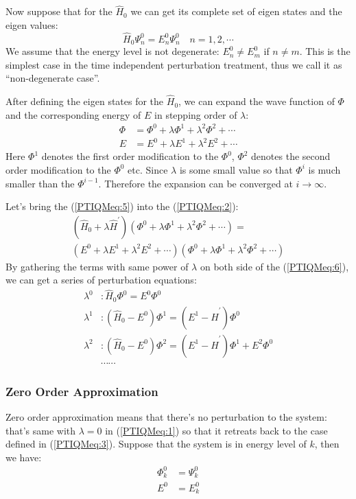 Now suppose that for the $\hat{H}_{0}$ we can get its complete set
of eigen states and the eigen values:
\begin{equation}\label{PTIQMeq:3}
\hat{H}_{0}\Psi^{0}_{n} = E^{0}_{n}\Psi^{0}_{n} \quad n = 1,
2,\cdots
\end{equation}
We assume that the energy level is not degenerate: $E^{0}_{n} \neq
E^{0}_{m}$ if $n \neq m$. This is the simplest case in the time
independent perturbation treatment, thus we call it as
``non-degenerate case''.

After defining the eigen states for the $\hat{H}_{0}$, we can expand
the wave function of $\Phi$ and the corresponding energy of $E$ in
stepping order of $\lambda$:
\begin{align}\label{PTIQMeq:5}
\Phi &= \Phi^{0} + \lambda\Phi^{1} + \lambda^{2}\Phi^{2} + \cdots
\nonumber \\
E &= E^{0} + \lambda E^{1} + \lambda^{2}E^{2} + \cdots
\end{align}
Here $\Phi^{1}$ denotes the first order modification to the
$\Phi^{0}$, $\Phi^{2}$ denotes the second order modification to the
$\Phi^{0}$ etc. Since $\lambda$ is some small value so that
$\Phi^{i}$ is much smaller than the $\Phi^{i-1}$. Therefore the
expansion can be converged at $i \rightarrow \infty$.

Let's bring the (\ref{PTIQMeq:5}) into the (\ref{PTIQMeq:2}):
\begin{multline}\label{PTIQMeq:6}
(\hat{H}_{0} + \lambda\hat{H}^{'})(\Phi^{0} + \lambda\Phi^{1} +
\lambda^{2}\Phi^{2} + \cdots) = \\
(E^{0} + \lambda E^{1} + \lambda^{2}E^{2} + \cdots)(\Phi^{0} +
\lambda\Phi^{1} + \lambda^{2}\Phi^{2} + \cdots)
\end{multline}
By gathering the terms with same power of $\lambda$ on both side of
the (\ref{PTIQMeq:6}), we can get a series of perturbation
equations:
\begin{align}\label{PTIQMeq:7}
\lambda^{0} &: \hat{H}_{0}\Phi^{0} = E^{0}\Phi^{0} \nonumber \\
\lambda^{1} &: (\hat{H}_{0} - E^{0})\Phi^{1} =
(E^{1} - \hat{H}^{'})\Phi^{0} \nonumber \\
\lambda^{2} &: (\hat{H}_{0} - E^{0})\Phi^{2} =
(E^{1} - \hat{H}^{'})\Phi^{1} +E^{2}\Phi^{0}  \nonumber \\
&\cdots\cdots
\end{align}

\subsubsection{Zero Order Approximation}
Zero order approximation means that there's no perturbation to the
system: that's same with $\lambda = 0$ in (\ref{PTIQMeq:1}) so that
it retreats back to the case defined in (\ref{PTIQMeq:3}). Suppose
that the system is in energy level of $k$, then we have:
\begin{align}\label{PTIQMeq:9}
\Phi^{0}_{k} &= \Psi^{0}_{k} \nonumber \\
E^{0} &= E^{0}_{k}
\end{align}



